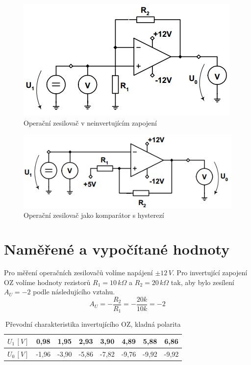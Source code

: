 \documentclass[12pt]{article} %
\begin{document}
\begin{figure}[H]
\center
\includegraphics[scale=0.7]{schema2.png}
\caption{Operační zesilovač v neinvertujícím zapojení}
\end{figure}

\begin{figure}[H]
\center
\includegraphics[scale=0.7]{schema3.png}
\caption{Operační zesilovač jako komparátor s hysterezí}
\end{figure}

\section{Naměřené a vypočítané hodnoty}
Pro měření operačních zesilovačů volíme napájení $\pm12\,V$. Pro invertující zapojení OZ volíme hodnoty rezistorů $R_1=10\,k\Omega$ a $R_2=20\,k\Omega$ tak, aby bylo zesílení $A_U=-2$ podle následujícího vztahu.
\begin{equation}
A_U = -\frac{R_2}{R_1}=-\frac{20k}{10k}=-2
\end{equation}

\begin{table}[H]
\center
\caption{Převodní charakteristika invertujícího OZ, kladná polarita}
\begin{tabular}{|c|c|c|c|c|c|c|c|}
\hline 
$U_1\,[V]$ & 0,98 & 1,95 & 2,93 & 3,90 & 4,89 & 5,88 & 6,86 \\ 
\hline 
$U_0\,[V]$ & -1,96 & -3,90 & -5,86 & -7,82 & -9,76 & -9,92 & -9,92 \\ 
\hline 
\end{tabular}
\end{table}
\end{document}
